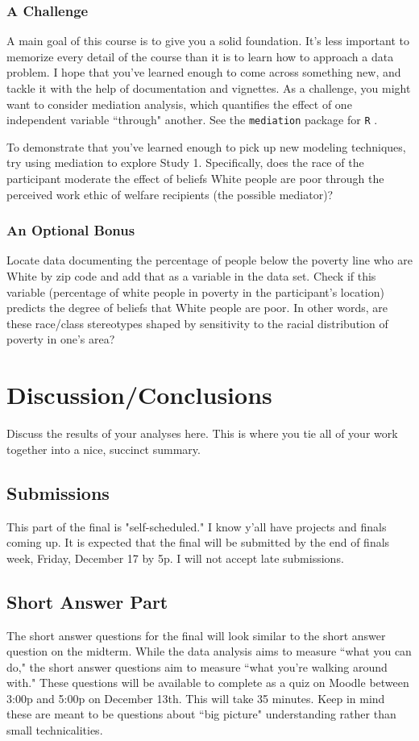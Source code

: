 \documentclass{article}\usepackage[]{graphicx}\usepackage[]{color}
\begin{document}
\begin{multicols}{2}
\subsubsection{A Challenge}
A main goal of this course is to give you a solid foundation. It's less important to memorize every detail of the course than it is to learn how to approach a data problem. I hope that you've learned enough to come across something new, and tackle it with the help of documentation and vignettes. As a challenge, you might want to consider mediation analysis, which quantifies the effect of one independent variable ``through" another. See the \texttt{mediation} package for \texttt{R} \citep{mediation1, mediation2}.

To demonstrate that you've learned enough to pick up new modeling techniques, try using mediation to explore Study 1. Specifically, does the race of the participant moderate the effect of beliefs White people are poor through the perceived work ethic of welfare recipients (the possible mediator)?

\subsubsection{An Optional Bonus}
Locate data documenting the percentage of people below the poverty line who are White by zip code and add that as a variable in the data set. Check if this variable (percentage of white people in poverty in the participant's location) predicts the degree of beliefs that White people are poor. In other words, are these race/class stereotypes shaped by sensitivity to the racial distribution of poverty in one's area?

\section{Discussion/Conclusions}
Discuss the results of your analyses here. This is where you tie all of your work together into a nice, succinct summary.

\subsection{Submissions}
This part of the final is "self-scheduled." I know y'all have projects and finals coming up. It is expected that the final will be submitted by the end of finals week, Friday, December 17	by 5p. I will not accept late submissions.

\subsection{Short Answer Part}
The short answer questions for the final will look similar to the short answer question on the midterm. While the data analysis aims to measure ``what you can do," the short answer questions aim to measure ``what you're walking around with." These questions will be available to complete as a quiz on Moodle between 3:00p and 5:00p on December 13th. This will take 35 minutes. Keep in mind these are meant to be questions about ``big picture" understanding rather than small technicalities.


\end{multicols}
\end{document}
